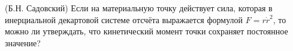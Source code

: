 (Б.Н. Садовский)
Если на материальную точку действует сила, которая в инерциальной декартовой
системе отсчёта выражается формулой $F=r\dot r^2$, то можно ли утверждать,
что кинетический момент точки сохраняет постоянное значение?
